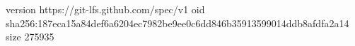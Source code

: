 version https://git-lfs.github.com/spec/v1
oid sha256:187eca15a84def6a6204ec7982be9ee0c6dd846b35913599014ddb8afdfa2a14
size 275935
